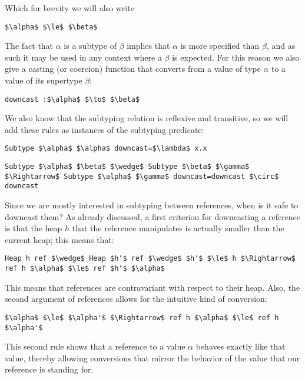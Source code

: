 \documentclass[a4paper]{article}
\begin{document}
Which for brevity we will also write

\begin{lstlisting}
$\alpha$ $\le$ $\beta$
\end{lstlisting}
The fact that $\alpha $ is a subtype of $\beta $ implies that $\alpha $ is more specified than $\beta $, and as such it may be used in any context where a $\beta $ is expected. For this reason we also give a casting (or coercion) function that converts from a value of type $\alpha $ to a value of its supertype $\beta $:

\begin{lstlisting}
downcast :$\alpha$ $\to$ $\beta$
\end{lstlisting}
We also know that the subtyping relation is reflexive and transitive, so we will add these rules as instances of the subtyping predicate:

\begin{lstlisting}
Subtype $\alpha$ $\alpha$ downcast=$\lambda$ x.x
\end{lstlisting}

\begin{lstlisting}
Subtype $\alpha$ $\beta$ $\wedge$ Subtype $\beta$ $\gamma$ $\Rightarrow$ Subtype $\alpha$ $\gamma$ downcast=downcast $\circ$ downcast
\end{lstlisting}

Since we are mostly interested in subtyping between references, when is it safe to downcast them? As already discussed, a first criterion for downcasting a reference is that the heap $h$ that the reference manipulates is actually smaller than the current heap; this means that:

\begin{lstlisting}
Heap h ref $\wedge$ Heap $h'$ ref $\wedge$ $h'$ $\le$ h $\Rightarrow$ ref h $\alpha$ $\le$ ref $h'$ $\alpha$
\end{lstlisting}

This means that references are contravariant with respect to their heap. Also, the second argument of references allows for the intuitive kind of conversion:

\begin{lstlisting}
$\alpha$ $\le$ $\alpha'$ $\Rightarrow$ ref h $\alpha$ $\le$ ref h $\alpha'$
\end{lstlisting}

This second rule shows that a reference to a value $\alpha $ behaves exactly like that value, thereby allowing conversions that mirror the behavior of the value that our reference is standing for.
\end{document}
